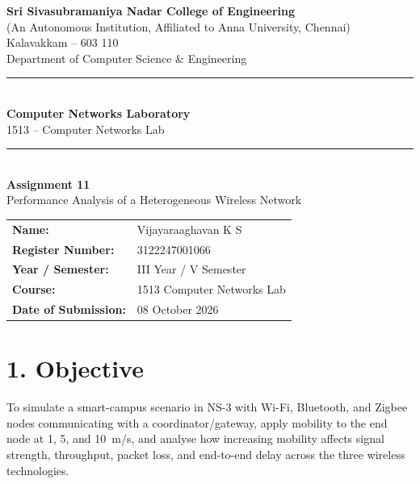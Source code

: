 \documentclass[11pt]{article}
\title{\vspace{-2cm}}
\date{}
\begin{document}
\begin{titlepage}
\centering
\vspace*{1cm}
{\large \textbf{Sri Sivasubramaniya Nadar College of Engineering}}\\
{\small (An Autonomous Institution, Affiliated to Anna University, Chennai)}\\
{\small Kalavakkam -- 603 110}\\[0.3cm]
{\small Department of Computer Science \& Engineering}\\[1.5cm]

\rule{\linewidth}{0.5mm}\\[0.4cm]
{\LARGE \textbf{Computer Networks Laboratory}}\\[0.3cm]
{\Large 1513 -- Computer Networks Lab}\\[0.4cm]
\rule{\linewidth}{0.5mm}\\[1.5cm]

{\huge \textbf{Assignment 11}}\\[0.4cm]
{\Large Performance Analysis of a Heterogeneous Wireless Network}\\[2cm]

\begin{center}
\begin{tabular}{ll}
\textbf{Name:} & Vijayaraaghavan K S \\[0.2cm]
\textbf{Register Number:} & 3122247001066 \\[0.2cm]
\textbf{Year / Semester:} & III Year / V Semester \\[0.2cm]
\textbf{Course:} & 1513 Computer Networks Lab \\[0.2cm]
\textbf{Date of Submission:} & 08 October 2026 \\[0.2cm]
\end{tabular}
\end{center}

\vfill
\end{titlepage}

\section*{1. Objective}
To simulate a smart-campus scenario in NS-3 with Wi-Fi, Bluetooth, and
Zigbee nodes communicating with a coordinator/gateway, apply mobility to the
end node at 1, 5, and 10~m/s, and analyse how increasing mobility affects
signal strength, throughput, packet loss, and end-to-end delay across the
three wireless technologies.
\end{document}
